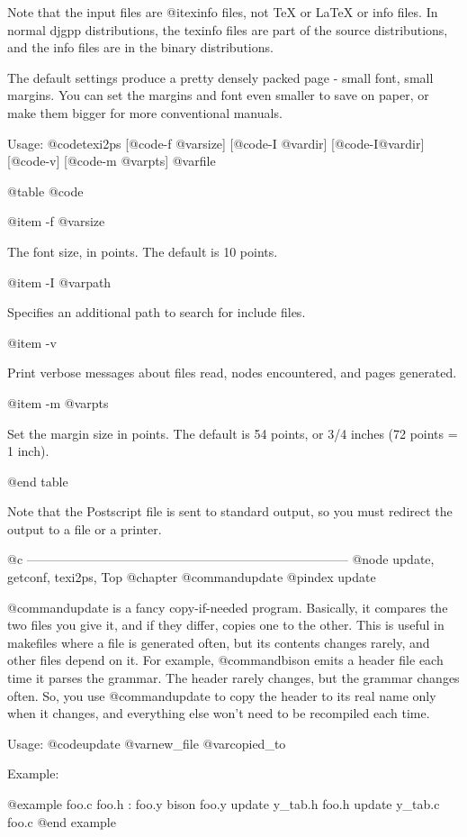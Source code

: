 Note that the input files are @i{texinfo} files, not TeX or LaTeX or
info files.  In normal djgpp distributions, the texinfo files are part
of the source distributions, and the info files are in the binary
distributions.

The default settings produce a pretty densely packed page - small font,
small margins.  You can set the margins and font even smaller to save on
paper, or make them bigger for more conventional manuals.

Usage: @code{texi2ps} [@code{-f} @var{size}] [@code{-I} @var{dir}]
[@code{-I}@var{dir}] [@code{-v}] [@code{-m} @var{pts}] @var{file}

@table @code

@item -f @var{size}

The font size, in points.  The default is 10 points.

@item -I @var{path}

Specifies an additional path to search for include files.

@item -v

Print verbose messages about files read, nodes encountered, and pages
generated.

@item -m @var{pts}

Set the margin size in points.  The default is 54 points, or 3/4 inches
(72 points = 1 inch).

@end table

Note that the Postscript file is sent to standard output, so you must
redirect the output to a file or a printer.

@c -----------------------------------------------------------------------------
@node update, getconf, texi2ps, Top
@chapter @command{update}
@pindex update

@command{update} is a fancy copy-if-needed program.  Basically, it compares
the two files you give it, and if they differ, copies one to the other.
This is useful in makefiles where a file is generated often, but its
contents changes rarely, and other files depend on it.  For example,
@command{bison} emits a header file each time it parses the grammar.  The
header rarely changes, but the grammar changes often.  So, you use
@command{update} to copy the header to its real name only when it changes,
and everything else won't need to be recompiled each time.

Usage: @code{update} @var{new_file} @var{copied_to}

Example:

@example
foo.c foo.h : foo.y
        bison foo.y
        update y_tab.h foo.h
        update y_tab.c foo.c
@end example


